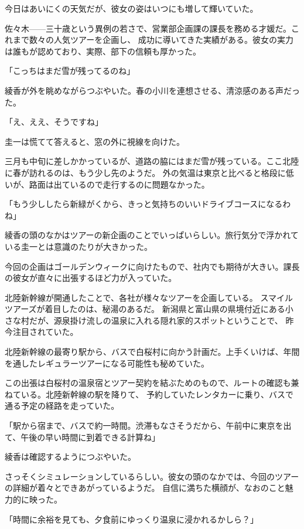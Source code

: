 ﻿\documentclass[
    book,tate,
    line_length=30zw,
    jafontsize=12pt,
    paper=b5j,
    landscape,
    ]{jlreq}
\begin{document}
今日はあいにくの天気だが、彼女の姿はいつにも増して輝いていた。

佐々木------三十歳という異例の若さで、営業部企画課の課長を務める才媛だ。これまで数々の人気ツアーを企画し、
成功に導いてきた実績がある。彼女の実力は誰もが認めており、実際、部下の信頼も厚かった。

「こっちはまだ雪が残ってるのね」

綾香が外を眺めながらつぶやいた。春の小川を連想させる、清涼感のある声だった。

「え、ええ、そうですね」

圭一は慌てて答えると、窓の外に視線を向けた。

三月も中旬に差しかかっているが、道路の脇にはまだ雪が残っている。ここ北陸に春が訪れるのは、もう少し先のようだ。
外の気温は東京と比べると格段に低いが、路面は出ているので走行するのに問題なかった。

「もう少ししたら新緑がくから、きっと気持ちのいいドライブコースになるわね」

綾香の頭のなかはツアーの新企画のことでいっぱいらしい。旅行気分で浮かれている圭一とは意識のたりが大きかった。

今回の企画はゴールデンウィークに向けたもので、社内でも期待が大きい。課長の彼女が直々に出張するほど力が入っていた。

北陸新幹線が開通したことで、各社が様々なツアーを企画している。 スマイルツアーズが着目したのは、秘湯のあるだ。
新潟県と富山県の県境付近にある小さな村だが、源泉掛け流しの温泉に入れる隠れ家的スポットということで、 昨今注目されていた。

北陸新幹線の最寄り駅から、バスで白桜村に向かう計画だ。上手くいけば、年間を通したレギュラーツアーになる可能性も秘めていた。

この出張は白桜村の温泉宿とツアー契約を結ぶためのもので、ルートの確認も兼ねている。北陸新幹線の駅を降りて、
予約していたレンタカーに乗り、バスで通る予定の経路を走っていた。

「駅から宿まで、バスで約一時間。渋滞もなさそうだから、午前中に東京を出て、午後の早い時間に到着できる計算ね」

綾香は確認するようにつぶやいた。

さっそくシミュレーションしているらしい。彼女の頭のなかでは、今回のツアーの詳細が着々とできあがっているようだ。
自信に満ちた横顔が、なおのこと魅力的に映った。

「時間に余裕を見ても、夕食前にゆっくり温泉に浸かれるかしら？」
\end{document}
